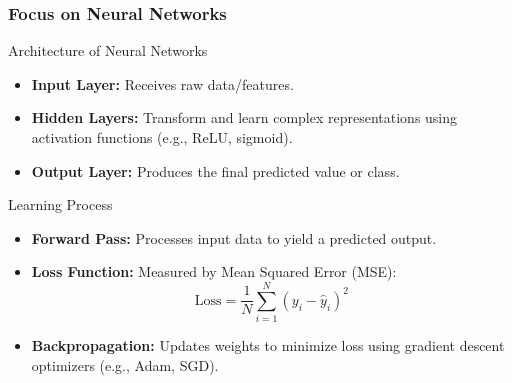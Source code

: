 \documentclass[aspectratio=169]{beamer}
\begin{document}
\begin{frame}[fragile]
    \frametitle{Focus on Neural Networks}
    
    \begin{block}{Architecture of Neural Networks}
        \begin{itemize}
            \item \textbf{Input Layer:} Receives raw data/features.
            \item \textbf{Hidden Layers:} Transform and learn complex representations using activation functions (e.g., ReLU, sigmoid).
            \item \textbf{Output Layer:} Produces the final predicted value or class.
        \end{itemize}
    \end{block}

    \begin{block}{Learning Process}
        \begin{itemize}
            \item \textbf{Forward Pass:} Processes input data to yield a predicted output.
            \item \textbf{Loss Function:} Measured by Mean Squared Error (MSE):
            \begin{equation}
                \text{Loss} = \frac{1}{N} \sum_{i=1}^{N} (y_i - \hat{y}_i)^2
            \end{equation}
            \item \textbf{Backpropagation:} Updates weights to minimize loss using gradient descent optimizers (e.g., Adam, SGD).
        \end{itemize}
    \end{block}
\end{frame}
\end{document}
